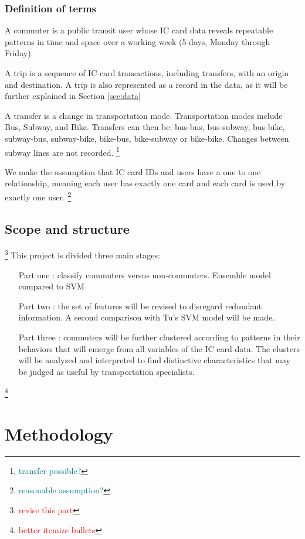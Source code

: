 \documentclass{article}
\newcommand{\selfnote}[1]{\footnote{\textcolor{red}{#1}}}
\newcommand{\domainDoubt}[1]{\footnote{\textcolor{teal}{#1}}}
\begin{document}
\subsubsection{Definition of terms}
A commuter is a public transit user whose IC card data reveals repeatable patterns in time and space over a working week (5 days, Monday through Friday).

A trip is a sequence of IC card transactions, including transfers, with an origin and destination. A trip is also represented as a record in the data, as it will be further explained in Section \ref{sec:data}

A transfer is a change in transportation mode. Transportation modes include Bus, Subway, and Bike. Transfers can then be: bus-bus, bus-subway, bus-bike, subway-bus, subway-bike, bike-bus, bike-subway or bike-bike. Changes between subway lines are not recorded. \domainDoubt{transfer possible?} 

We make the assumption that IC card IDs and users have a one to one relationship, meaning each user has exactly one card and each card is used by exactly one user. \domainDoubt{reasonable assumption?}

\subsection{Scope and structure}
\selfnote{revise this part}
This project is divided three main stages: 

\begin{itemize}
\item[Part one]: classify commuters versus non-commuters. Ensemble model compared to SVM

\item[Part two]: the set of features will be revised to disregard redundant information. A second comparison with Tu\cite{tu2016impact}'s SVM model will be made. 

\item[Part three]: commuters will be further clustered according to patterns in their behaviors that will emerge from all variables of the IC card data. The clusters will be analyzed and interpreted to find distinctive characteristics that may be judged as useful by transportation specialists. 
\end{itemize}

\selfnote{better itemize bullets}


\newpage
\section{Methodology}
\end{document}
